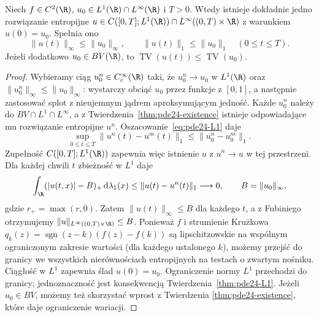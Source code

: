 \begin{twierdzenie}
\label{thm:pde24-existence-L1Linf}
Niech $f\in C^2(\R)$, $u_0\in L^1(\R)\cap L^\infty(\R)$
i $T>0$. Wtedy istnieje dokładnie jedno rozwiązanie entropijne
$u\in C([0,T];L^1(\R))\cap L^\infty((0,T)\times\R)$
z warunkiem $u(0)=u_0$. Spełnia ono
\[
 \|u(t)\|_\infty\le\|u_0\|_\infty,\qquad
 \|u(t)\|_1\le\|u_0\|_1
 \quad(0\le t\le T).
\]
Jeżeli dodatkowo $u_0\in BV(\R)$, to
$\operatorname{TV}(u(t))\le\operatorname{TV}(u_0)$.
\end{twierdzenie}
\begin{proof}
Wybieramy ciąg $u_0^n\in C_c^\infty(\R)$ taki, że
$u_0^n\to u_0$ w $L^1(\R)$ oraz
$\|u_0^n\|_\infty\le\|u_0\|_\infty$: wystarczy
obciąć $u_0$ przez funkcje z $[0,1]$, a następnie
zastosować splot z nieujemnym jądrem aproksymującym jedność.
Każde $u_0^n$ należy do $BV\cap L^1\cap L^\infty$,
a z Twierdzenia~\ref{thm:pde24-existence} istnieje
odpowiadające mu rozwiązanie entropijne $u^n$.
Oszacowanie~\eqref{eq:pde24-L1} daje
\[
 \sup_{0\le t\le T}\|u^n(t)-u^m(t)\|_1
 \le\|u_0^n-u_0^m\|_1.
\]
Zupełność $C([0,T];L^1(\R))$ zapewnia więc istnienie
$u$ z $u^n\to u$ w tej przestrzeni. Dla każdej chwili $t$ zbieżność w $L^1$ daje
\[
 \int_\R (|u(t,x)|-B)_+\,\mathrm d\lambda_1(x)
 \le\|u(t)-u^n(t)\|_1\longrightarrow0,
 \qquad B=\|u_0\|_\infty,
\]
gdzie $r_+=\max(r,0)$. Zatem $\|u(t)\|_\infty\le B$
dla każdego $t$, a z Fubiniego otrzymujemy
$\|u\|_{L^\infty((0,T)\times\R)}\le B$.
Ponieważ $f$ i strumienie Krużkowa
$q_k(z)=\operatorname{sgn}(z-k)(f(z)-f(k))$
są lipschitzowskie na wspólnym ograniczonym zakresie
wartości (dla każdego ustalonego $k$), możemy przejść
do granicy we wszystkich nierównościach entropijnych
na testach o zwartym nośniku. Ciągłość w $L^1$
zapewnia ślad $u(0)=u_0$. Ograniczenie normy $L^1$
przechodzi do granicy; jednoznaczność jest konsekwencją
Twierdzenia~\ref{thm:pde24-L1}. Jeżeli $u_0\in BV$,
możemy też skorzystać wprost z Twierdzenia
\ref{thm:pde24-existence}, które daje ograniczenie wariacji.
\end{proof}


